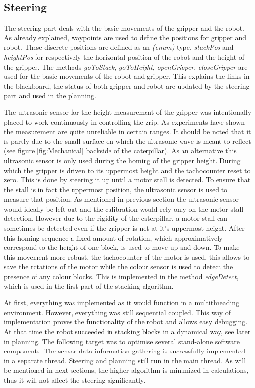 \documentclass{article}
\begin{document}
	\subsection{Steering}
	The steering part deals with the basic movements of the gripper and the robot. As already explained, waypoints are used to define the positions for gripper and robot. These discrete positions are defined as an \textit{(enum)} type, \textit{stackPos} and \textit{heightPos} for respectively the horizontal position of the robot and the height of the gripper. The methods \textit{goToStack}, \textit{goToHeight}, \textit{openGripper}, \textit{closeGripper} are used for the basic movements of the robot and gripper. This explains the links in the blackboard, the status of both gripper and robot are updated by the steering part and used in the planning.  
	
	The ultrasonic sensor for the height measurement of the gripper was intentionally placed to work continuously in controlling the grip. As experiments have shown the measurement are quite unreliable in certain ranges. It should be noted that it is partly due to the small surface on which the ultrasonic wave is meant to reflect (see figure \ref{fig:Mechanical} backside of the caterpillar). As an alternative this ultrasonic sensor is only used during the homing of the gripper height. During which the gripper is driven to its uppermost height and the tachocounter reset to zero. This is done by steering it up until a motor stall is detected. To ensure that the stall is in fact the uppermost position, the ultrasonic sensor is used to measure that position.
	 As mentioned in previous section the ultrasonic sensor would ideally be left out and the calibration would rely only on the motor stall detection. However due to the rigidity of the caterpillar, a motor stall can sometimes be detected even if the gripper is not at it's uppermost height. After this homing sequence a fixed amount of rotation, which approximatively correspond to the height of one block, is used to move up and down. To make this movement more robust, the tachocounter of the motor is used, this allows to save the rotations of the motor while the colour sensor is used to detect the presence of any colour blocks. This is implemented in the method \textit{edgeDetect}, which is used in the first part of the stacking algorithm.
	
	At first, everything was implemented as it would function in a multithreading environment. However, everything was still sequential coupled. This way of implementation proves the functionality of the robot and allows easy debugging. At that time the robot succeeded in stacking blocks in a dynamical way, see later in planning. The following target was to optimise several stand-alone software components. The sensor data information gathering is successfully implemented in a separate thread. Steering and planning still run in the main thread. As will be mentioned in next sections, the higher algorithm is minimized in calculations, thus it will not affect the steering significantly. 
	
\end{document}
